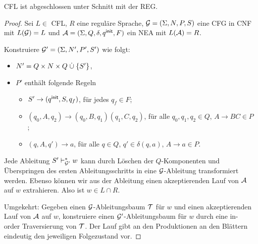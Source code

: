 \begin{Satz}
  \ac{CFL} ist abgeschlossen unter Schnitt mit der \ac{REG}.
\end{Satz}
\begin{proof}
  Sei $L\in$ CFL, $R$ eine reguläre Sprache, $\mathcal{G} = (\Sigma, N, P, S)$ eine CFG in CNF mit $L(\mathcal{G}) = L$
  und $\mathcal{A} =(\Sigma, Q,\delta,q^\mathsf{init},F)$ ein \ac{NEA} mit $L(\mathcal{A}) = R$.

  Konstruiere $\mathcal{G}' = (\Sigma, N', P', S')$ wie folgt:
  \begin{itemize}
  \item $N' = Q\times N \times Q \mathrel{\dot\cup} \{ S' \}$,
  \item $P'$ enthält folgende Regeln
    \begin{itemize}
    \item $S' \to (q^\mathsf{init}, S, q_f)$, für jedes $q_f \in F$;
    \item $(q_0, A, q_2) \to (q_0, B, q_1) (q_1, C, q_2)$, für alle $q_0, q_1, q_2 \in Q$, $A \to BC \in P$;
    \item $(q , A, q') \to a$, für alle $q\in Q$, $q' \in\delta (q, a)$, $A \to a \in P$.
    \end{itemize}
  \end{itemize}
  Jede Ableitung $S' \vdash^*_{\mathcal{G}'} w$ kann durch Löschen der $Q$-Komponenten und
  Überspringen des ersten Ableitungsschritts in eine $\mathcal{G}$-Ableitung
  transformiert werden.
  Ebenso können wir aus der Ableitung einen akzeptierenden Lauf von
  $\mathcal{A}$ auf $w$ extrahieren.
  Also ist $w \in L \cap R$.

  Umgekehrt: Gegeben einen $\mathcal{G}$-Ableitungsbaum $\mathcal{T}$ für $w$ und einen akzeptierenden
  Lauf von $\mathcal{A}$ auf $w$, konstruiere einen $\mathcal{G}'$-Ableitungsbaum
  für $w$ durch eine in-order Traversierung von $\mathcal{T}$. Der Lauf gibt an
  den Produktionen an den Blättern eindeutig den jeweiligen Folgezustand vor.
\end{proof}

